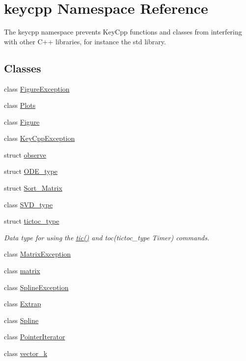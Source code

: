 \hypertarget{namespacekeycpp}{\section{keycpp Namespace Reference}
\label{namespacekeycpp}
}


The keycpp namespace prevents Key\-Cpp functions and classes from interfering with other C++ libraries, for instance the std library.  


\subsection*{Classes}
\begin{DoxyCompactItemize}
\item 
class \hyperlink{classkeycpp_1_1_figure_exception}{Figure\-Exception}
\item 
class \hyperlink{classkeycpp_1_1_plots}{Plots}
\item 
class \hyperlink{classkeycpp_1_1_figure}{Figure}
\item 
class \hyperlink{classkeycpp_1_1_key_cpp_exception}{Key\-Cpp\-Exception}
\item 
struct \hyperlink{structkeycpp_1_1observe}{observe}
\item 
struct \hyperlink{structkeycpp_1_1_o_d_e__type}{O\-D\-E\-\_\-type}
\item 
struct \hyperlink{structkeycpp_1_1_sort___matrix}{Sort\-\_\-\-Matrix}
\item 
class \hyperlink{classkeycpp_1_1_s_v_d__type}{S\-V\-D\-\_\-type}
\item 
struct \hyperlink{structkeycpp_1_1tictoc__type}{tictoc\-\_\-type}
\begin{DoxyCompactList}\small\item\em Data type for using the \hyperlink{namespacekeycpp_a6069a9eec0edfa1d401230013d98765e}{tic()} and toc(tictoc\-\_\-type Timer) commands. \end{DoxyCompactList}\item 
class \hyperlink{classkeycpp_1_1_matrix_exception}{Matrix\-Exception}
\item 
class \hyperlink{classkeycpp_1_1matrix}{matrix}
\item 
class \hyperlink{classkeycpp_1_1_spline_exception}{Spline\-Exception}
\item 
class \hyperlink{classkeycpp_1_1_extrap}{Extrap}
\item 
class \hyperlink{classkeycpp_1_1_spline}{Spline}
\item 
class \hyperlink{classkeycpp_1_1_pointer_iterator}{Pointer\-Iterator}
\item 
class \hyperlink{classkeycpp_1_1vector__k}{vector\-\_\-k}
\end{DoxyCompactItemize}
